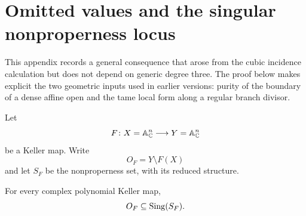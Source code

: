 \section{Omitted values and the singular nonproperness locus}
\label{app:omitted-values}

This appendix records a general consequence that arose from the cubic
incidence calculation but does not depend on generic degree three.  The proof
below makes explicit the two geometric inputs used in earlier versions:
purity of the boundary of a dense affine open and the tame local form along a
regular branch divisor.

Let
\[
F\colon X=\mathbb A^n_{\mathbb C}\longrightarrow Y=\mathbb A^n_{\mathbb C}
\]
be a Keller map.  Write
\[
O_F=Y\setminus F(X)
\]
and let \(S_F\) be the nonproperness set, with its reduced structure.

\begin{theorem}
\label{thm:omitted-singular}
For every complex polynomial Keller map,
\[
O_F\subseteq\operatorname{Sing}(S_F).
\]
\end{theorem}

